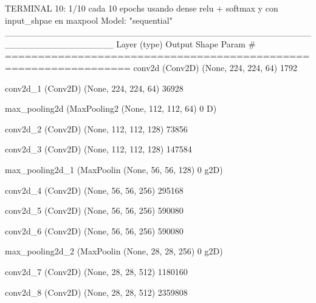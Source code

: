 \documentclass[11pt, a4paper]{article} %
\begin{document}
 
 
TERMINAL 10:  1/10 cada 10 epochs usando dense relu + softmax y con input_shpae en maxpool
Model: "sequential"
_________________________________________________________________
 Layer (type)                Output Shape              Param #   
=================================================================
 conv2d (Conv2D)             (None, 224, 224, 64)      1792      
                                                                 
 conv2d_1 (Conv2D)           (None, 224, 224, 64)      36928     
                                                                 
 max_pooling2d (MaxPooling2  (None, 112, 112, 64)      0         
 D)                                                              
                                                                 
 conv2d_2 (Conv2D)           (None, 112, 112, 128)     73856     
                                                                 
 conv2d_3 (Conv2D)           (None, 112, 112, 128)     147584    
                                                                 
 max_pooling2d_1 (MaxPoolin  (None, 56, 56, 128)       0         
 g2D)                                                            
                                                                 
 conv2d_4 (Conv2D)           (None, 56, 56, 256)       295168    
                                                                 
 conv2d_5 (Conv2D)           (None, 56, 56, 256)       590080    
                                                                 
 conv2d_6 (Conv2D)           (None, 56, 56, 256)       590080    
                                                                 
 max_pooling2d_2 (MaxPoolin  (None, 28, 28, 256)       0         
 g2D)                                                            
                                                                 
 conv2d_7 (Conv2D)           (None, 28, 28, 512)       1180160   
                                                                 
 conv2d_8 (Conv2D)           (None, 28, 28, 512)       2359808   
                                                                 
\end{document}
